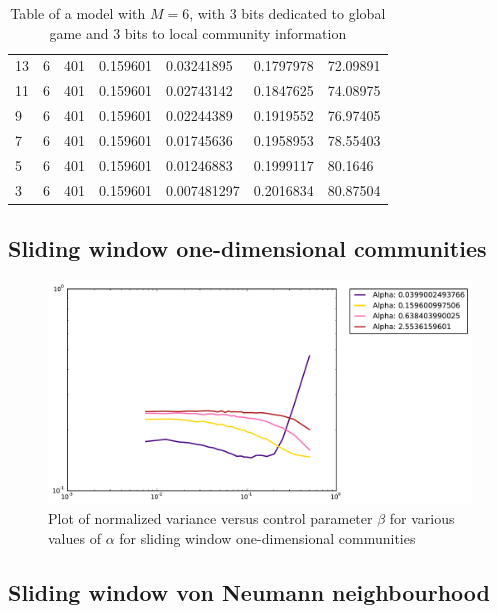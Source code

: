 \begin{table}
{\begin{tabular}{lllllll}
    13 &  6 &  401 &  0.159601 &   0.03241895 &   0.1797978 &  72.09891 \\
    11 &  6 &  401 &  0.159601 &   0.02743142 &   0.1847625 &  74.08975 \\
     9 &  6 &  401 &  0.159601 &   0.02244389 &   0.1919552 &  76.97405 \\
     7 &  6 &  401 &  0.159601 &   0.01745636 &   0.1958953 &  78.55403 \\
     5 &  6 &  401 &  0.159601 &   0.01246883 &   0.1999117 &   80.1646 \\
     3 &  6 &  401 &  0.159601 &  0.007481297 &   0.2016834 &  80.87504 \\
\bottomrule
\end{tabular}%
}
\caption{Table of a model with $M=6$, with 3 bits dedicated to global game and 3 bits to local community information}
\label{table:fixed m6}
\end{table}

\subsection{Sliding window one-dimensional communities}

\begin{figure}[h]
\begin{center}
\includegraphics[scale=0.4]{images/results/vicinity_sliding_n401_rounds10000_partial.pdf}
\caption{Plot of normalized variance versus control parameter $\beta$ for various values of $\alpha$  for sliding window one-dimensional communities}
\label{fig:sliding vicinity partial}
\end{center}
\end{figure}

\subsection{Sliding window von Neumann neighbourhood}

